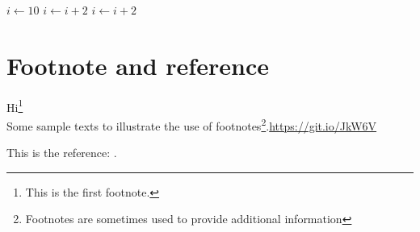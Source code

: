\documentclass{article}
\begin{document}
\begin{algorithmic}
\STATE $i\gets 10$
    \STATE $i\gets i+2$
\ELSE
{}
   \STATE $i\gets i+2$
   \ENDIF
\ENDIF
\end{algorithmic}

\section{Footnote and reference }
Hi\footnote{This is the first footnote.}\\
Some sample texts to illustrate the use of footnotes\footnote{Footnotes are sometimes used to provide additional information}.\url{https://git.io/JkW6V}





This is the reference: \cite{holmes2004artificial}.

\printbibliography
\end{document}
